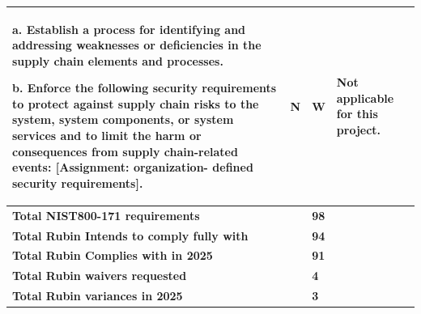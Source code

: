 \begin{longtable} {|p{}|p{}|p{}|p{} |}
{a. Establish a process for identifying and addressing weaknesses or deficiencies in the supply chain elements and processes.

b. Enforce the following security requirements to protect against supply chain risks to the system, system components, or system services and to limit the harm or consequences from supply chain-related events: [Assignment: organization- defined security requirements].}&{N}&{W}&{Not applicable for this project.} \\ \hline
\textbf{Total NIST800-171 requirements}&\textbf{}&\textbf{98}& \\ \hline
\textbf{Total Rubin Intends to comply fully with }&\textbf{}&\textbf{94}& \\ \hline
\textbf{Total Rubin Complies with in 2025}&\textbf{}&\textbf{91}& \\ \hline
\textbf{Total Rubin waivers requested }&\textbf{}&\textbf{4}& \\ \hline
\textbf{Total Rubin variances in 2025}&\textbf{}&\textbf{3}& \\ \hline
\end{longtable} \normalsize
